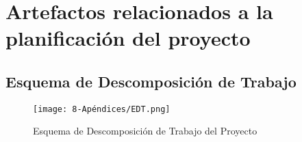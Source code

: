 \chapter{Artefactos relacionados a la planificación del proyecto}
\section{Esquema de Descomposición de Trabajo}

\begin{figure}[H]
    \centering
    \texttt{[image: 8-Apéndices/EDT.png]}
    \caption{Esquema de Descomposición de Trabajo del Proyecto}
    \label{fig:EDT}
\end{figure}

\cleardoublepage